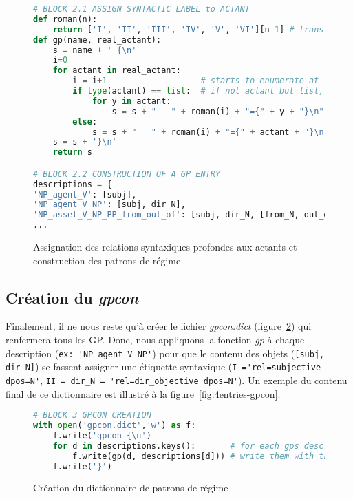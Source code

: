 \begin{figure}[htb]
  \caption{Assignation des relations syntaxiques profondes aux actants et construction des patrons de régime}
	\label{fig:assignationrel}
\begin{lstlisting}[language=Python]
# BLOCK 2.1 ASSIGN SYNTACTIC LABEL to ACTANT
def roman(n):
    return ['I', 'II', 'III', 'IV', 'V', 'VI'][n-1] # transforms arabic numbers in roman numbers
def gp(name, real_actant):
    s = name + ' {\n'
    i=0
    for actant in real_actant:
        i = i+1                   # starts to enumerate at 1
        if type(actant) == list:  # if not actant but list, apply function to actants in list
            for y in actant:
                s = s + "   " + roman(i) + "={" + y + "}\n"
        else:
            s = s + "   " + roman(i) + "={" + actant + "}\n" # apply function to actant
    s = s + '}\n'
    return s 

# BLOCK 2.2 CONSTRUCTION OF A GP ENTRY
descriptions = {
'NP_agent_V': [subj],
'NP_agent_V_NP': [subj, dir_N],
'NP_asset_V_NP_PP_from_out_of': [subj, dir_N, [from_N, out_of_N]],
...
\end{lstlisting}
\end{figure}

\subsection{Création du \emph{gpcon}}

Finalement, il ne nous reste qu'à créer le fichier \emph{gpcon.dict} (figure~\ref{fig:creationgpcon}) qui renfermera tous les \ac{GP}. Donc, nous appliquons la fonction \emph{gp} à chaque description (\lstinline|ex: 'NP_agent_V_NP'|) pour que le contenu des objets (\lstinline|[subj, dir_N]|) se fassent assigner une étiquette syntaxique (\lstinline|I ='rel=subjective dpos=N'|, \lstinline|II = dir_N = 'rel=dir_objective dpos=N'|). Un exemple du contenu final de ce dictionnaire est illustré à la figure~\ref{fig:4entries-gpcon}.

\begin{figure}[htb]
  \caption{Création du dictionnaire de patrons de régime}
	\label{fig:creationgpcon}
\begin{lstlisting}[language=Python]
# BLOCK 3 GPCON CREATION
with open('gpcon.dict','w') as f: 
    f.write('gpcon {\n')
    for d in descriptions.keys():       # for each gps descriptions,
        f.write(gp(d, descriptions[d])) # write them with the correct syntactic label
    f.write('}')
\end{lstlisting}
\end{figure}


